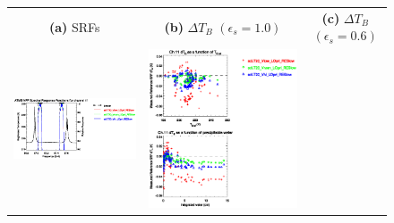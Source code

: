 \begin{figure}[H]
  \centering
  \begin{tabular}{c c c}
    \textsf{\textbf{(a)} SRFs} &
    \textsf{\textbf{(b)} $\Delta T_B$ $(\epsilon_s = 1.0)$} &
    \textsf{\textbf{(c)} $\Delta T_B$ $(\epsilon_s = 0.6)$} \\
    \includegraphics[bb=80 400 280 558,clip,scale=0.85]{graphics/srf/Vset/atms_npp.ch11.osrf.eps} &
    \includegraphics[bb=85 400 260 558,clip,scale=0.85]{graphics/dtb/Vset/e1.0_r0.0/atms_npp.ch11.dTb.eps} & 

\end{tabular}
\end{figure}

